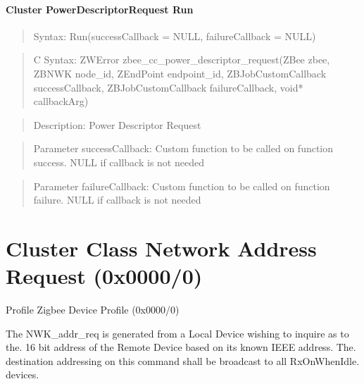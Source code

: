 \paragraph{Cluster PowerDescriptorRequest Run}
\begin{quote}Syntax: Run(successCallback = NULL, failureCallback = NULL)\end{quote}
\begin{quote}C Syntax: ZWError zbee\_cc\_power\_descriptor\_request(ZBee zbee, ZBNWK node\_id, ZEndPoint endpoint\_id, ZBJobCustomCallback successCallback, ZBJobCustomCallback failureCallback, void* callbackArg)\end{quote}
\begin{quote}Description: Power Descriptor Request\end{quote}
\begin{quote}Parameter successCallback: Custom function to be called on function success. NULL if callback is not needed\end{quote}
\begin{quote}Parameter failureCallback: Custom function to be called on function failure. NULL if callback is not needed\end{quote}



\section{Cluster Class Network Address Request (0x0000/0)}

Profile Zigbee Device Profile (0x0000/0)

The NWK\_addr\_req is generated from a Local Device wishing to inquire as to the. 16 bit address of the Remote Device based on its known IEEE address. The. destination addressing on this command shall be broadcast to all RxOnWhenIdle. devices.
